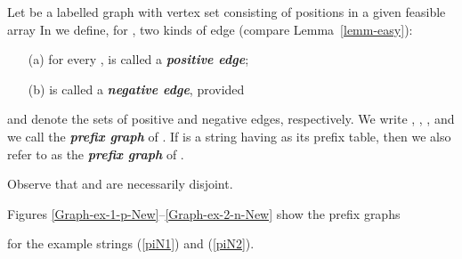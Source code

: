 \documentclass[runningheads,a4paper]{llncs}
\def\s#1{\mbox{\boldmath }}
\def\itbf#1{\textit{\textbf{#1}}}
\newif\ifRev
\begin{document}
\begin{definition}
\label{defn-P}
Let  be a labelled graph with vertex set  consisting of positions in a given feasible array
 In  we define, for , two kinds of edge
(compare Lemma~\ref{lemm-easy}):
\begin{itemize}
\item[(a)]
for every ,  is called a \itbf{positive edge};
\item[(b)]
 is called a \itbf{negative edge}, provided 
\end{itemize}
 and  denote the sets of positive and negative edges, respectively.  We write
, ,
,
and we call  the \itbf{prefix graph}
 of \s{y}.
If  is a string having 
as its prefix table,
then we also refer to  as the \itbf{prefix graph}
 of \s{x}.
\end{definition}
Observe that  and  are necessarily disjoint.
\ifRev
Figures \ref{Graph-ex-1-p}--\ref{Graph-ex-2-n} show the prefix graphs,
as given in \cite{CRSW13}, for the example strings (\ref{pi1}) and (\ref{pi2}).
Again, in
\fi
Figures \ref{Graph-ex-1-p-New}--\ref{Graph-ex-2-n-New} show the prefix graphs
\ifRev of two different indeterminate
\fi
for the example strings (\ref{piN1}) and (\ref{piN2}).







\ifRev
\begin{figure}[htbp]
  \begin{minipage}{0.5\linewidth}
  \centering
  \texttt{[image: ex-2-p]}\\
  \caption{ for }\label{Graph-ex-2-p}
  \end{minipage}
  \hfill
  \begin{minipage}{0.5\linewidth}
  \centering
  \texttt{[image: ex-2-n]}\\
  \caption{ for }\label{Graph-ex-2-n}
  \end{minipage}
\end{figure}
\fi
\end{document}
